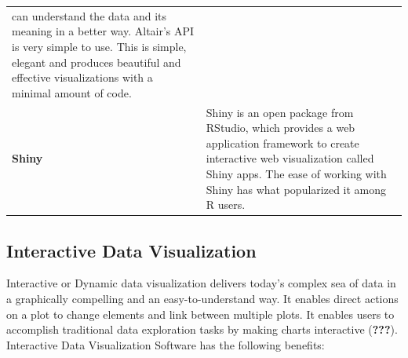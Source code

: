 \documentclass[]{book}
\begin{document}
\begin{longtable}[]{@{}ll@{}}
\begin{minipage}[t]{0.78\columnwidth}
can understand the data and its meaning in a better way. Altair's API is
very simple to use. This is simple, elegant and produces beautiful and
effective visualizations with a minimal amount of code.\strut
\end{minipage}\tabularnewline
\begin{minipage}[t]{0.16\columnwidth}\raggedright\strut
\textbf{Shiny}\strut
\end{minipage} & \begin{minipage}[t]{0.78\columnwidth}\raggedright\strut
Shiny is an open package from RStudio, which provides a web application
framework to create interactive web visualization called Shiny apps. The
ease of working with Shiny has what popularized it among R users.\strut
\end{minipage}\tabularnewline
\bottomrule
\end{longtable}

\subsection{Interactive Data
Visualization}\label{interactive-data-visualization}

Interactive or Dynamic data visualization delivers today's complex sea
of data in a graphically compelling and an easy-to-understand way. It
enables direct actions on a plot to change elements and link between
multiple plots. It enables users to accomplish traditional data
exploration tasks by making charts interactive ({\textbf{???}}).
Interactive Data Visualization Software has the following benefits:
\end{document}
